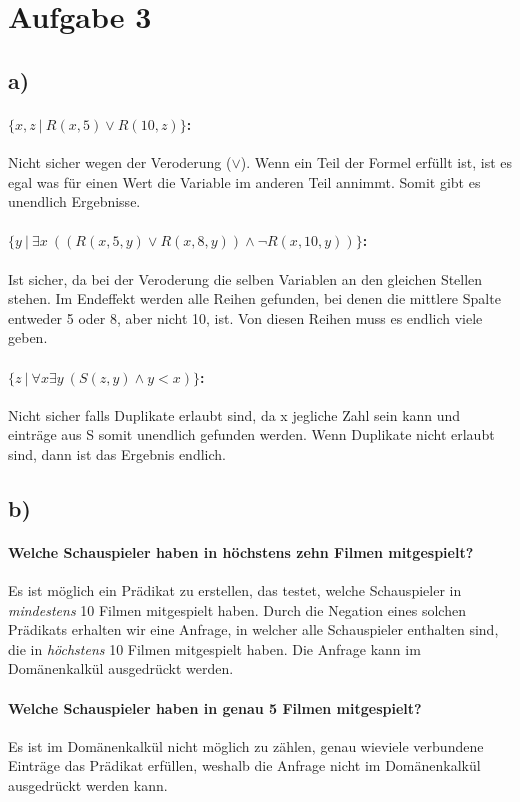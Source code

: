 \pagebreak
\section*{Aufgabe 3}
\subsection*{a)}
\paragraph*{$ \{x,z\ |\ R(x,5)\lor R(10,z)\} $:}
Nicht sicher wegen der Veroderung ($ \lor $). Wenn ein Teil der Formel erfüllt ist, ist es egal was für einen Wert die Variable im anderen Teil annimmt. Somit gibt es unendlich Ergebnisse.
\paragraph*{$ \{y\ |\ \exists x\ ((R(x,5,y)\lor R(x,8,y))\land \neg R(x,10,y))\} $:}
Ist sicher, da bei der Veroderung die selben Variablen an den gleichen Stellen stehen. Im Endeffekt werden alle Reihen gefunden, bei denen die mittlere Spalte entweder 5 oder 8, aber nicht 10, ist. Von diesen Reihen muss es endlich viele geben.
\paragraph*{$ \{z\ |\ \forall x\exists y\ (S(z,y)\land y<x)\} $:}
Nicht sicher falls Duplikate erlaubt sind, da x jegliche Zahl sein kann und einträge aus S somit unendlich gefunden werden. Wenn Duplikate nicht erlaubt sind, dann ist das Ergebnis endlich.
\subsection*{b)}
\paragraph*{Welche Schauspieler haben in höchstens zehn Filmen mitgespielt?}
Es ist möglich ein Prädikat zu erstellen, das testet, welche Schauspieler in \emph{mindestens} 10 Filmen mitgespielt haben. Durch die Negation eines solchen Prädikats erhalten wir eine Anfrage, in welcher alle Schauspieler enthalten sind, die in \emph{höchstens} 10 Filmen mitgespielt haben. Die Anfrage kann im Domänenkalkül ausgedrückt werden.
\paragraph*{Welche Schauspieler haben in genau 5 Filmen mitgespielt?}
Es ist im Domänenkalkül nicht möglich zu zählen, genau wieviele verbundene Einträge das Prädikat erfüllen, weshalb die Anfrage nicht im Domänenkalkül ausgedrückt werden kann.
